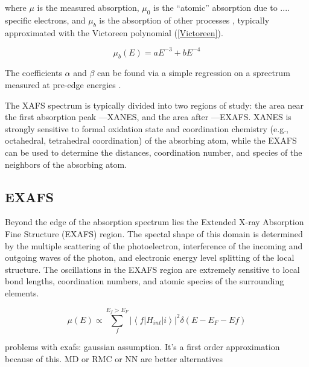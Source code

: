 \noindent where $\mu$ is the measured absorption, $ \mu_0 $  is the ``atomic'' absorption due to .... specific electrons, and $ \mu_b $ 
is the absorption of other processes \cite{klementev2000xafs}, typically approximated with the Victoreen polynomial (\ref{Victoreen}).

\begin{equation}
    \label{Victoreen}
    \mu_b(E) = aE^{-3} + bE^{-4}
\end{equation}

\noindent The coefficients $ \alpha $ and $ \beta $ can be found via a simple regression on a sprectrum measured at pre-edge energies \cite{klementev2000xafs}. 

The XAFS spectrum is typically divided into two regions of study: the area near the first absorption peak ---XANES, and the area after ---EXAFS. XANES is strongly sensitive to formal oxidation state and coordination
chemistry (e.g., octahedral, tetrahedral coordination) of the absorbing atom, while the EXAFS
can be used to determine the distances, coordination number, and species of the neighbors of
the absorbing atom.

\subsection{EXAFS}
Beyond the edge of the absorption spectrum lies the Extended X-ray Absorption Fine Structure (EXAFS) region. The spectal shape of this domain is determined by the multiple scattering of the photoelectron, interference of the incoming and outgoing waves of the photon, and electronic energy level splitting of the local structure. The oscillations in the EXAFS region are extremely sensitive to local bond lengths, coordination numbers, and atomic species of the surrounding elements.

\begin{equation}
    \label{FermisGoldenRule}
    \mu(E) \varpropto \sum_{f}^{E_f > E_F} \left\lvert \left\langle f \lvert H_{int} \rvert i \right\rangle \right\rvert ^2 \delta (E - E_F - Ef)  
\end{equation}

problems with exafs: gaussian assumption. It's a first order approximation because of this. MD or RMC or NN are better alternatives

